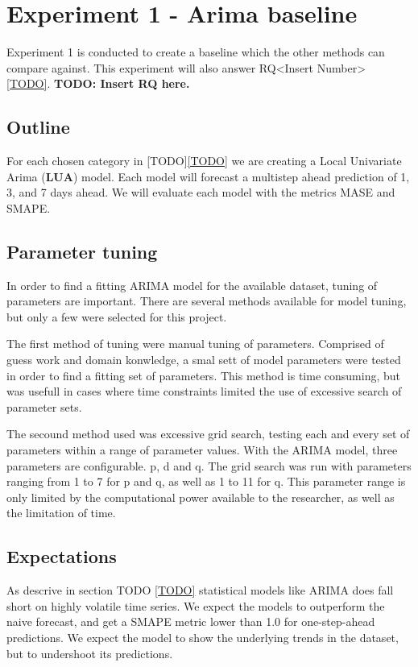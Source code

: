 \section{Experiment 1 - Arima baseline}
\label{section:Method:Experiment1-Arima}

Experiment 1 is conducted to create a baseline which
the other methods can compare against. This experiment will also
answer RQ<Insert Number> \cref{TODO}.
\textbf{TODO: Insert RQ here.}

\subsection{Outline}
For each chosen category in [TODO]\cref{TODO} we are creating a Local Univariate Arima (\textbf{LUA})
model. Each model will forecast a multistep ahead prediction of 1, 3, and 7 days ahead.
We will evaluate each model with the metrics MASE and SMAPE.


\subsection{Parameter tuning}
\label{section:Method:Arima:Tuning}
In order to find a fitting ARIMA model for the available dataset, tuning of parameters are important.
There are several methods available for model tuning, but only a few were selected for this project.

The first method of tuning were manual tuning of parameters.
Comprised of guess work and domain konwledge, a smal sett of model parameters were tested in order to find a fitting set of parameters.
This method is time consuming, but was usefull in cases where time constraints limited the use of excessive search of parameter sets.

The secound method used was excessive grid search, testing each and every set of parameters within a range of parameter values.
With the ARIMA model, three parameters are configurable. p, d and q.
The grid search was run with parameters ranging from 1 to 7 for p and q, as well as 1 to 11 for q.
This parameter range is only limited by the computational power available to the researcher, as well as the limitation of time.


\subsection{Expectations}
As descrive in section TODO \cref{TODO} statistical models like ARIMA does
fall short on highly volatile time series.
We expect the models to outperform the naive forecast, and get a SMAPE metric
lower than 1.0 for one-step-ahead predictions.
We expect the model to show the underlying trends in the dataset, but to
undershoot its predictions.

